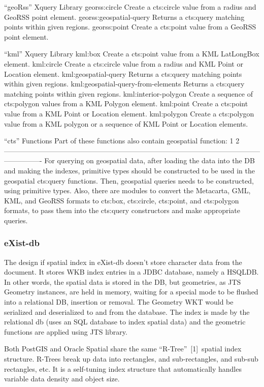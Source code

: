 \documentclass[a4paper,12pt]{article}
\begin{document}
“geoRss” Xquery Library
georss:circle
Create a cts:circle value from a radius and GeoRSS point element.
georss:geospatial-query
Returns a cts:query matching points within given regions.
georss:point
Create a cts:point value from a GeoRSS point element.

“kml” Xquery Library
kml:box
Create a cts:point value from a KML LatLongBox element.
kml:circle
Create a cts:circle value from a radius and KML Point or Location element.
kml:geospatial-query
Returns a cts:query matching points within given regions.
kml:geospatial-query-from-elements
Returns a cts:query matching points within given regions.
kml:interior-polygon
Create a sequence of cts:polygon values from a KML Polygon element.
kml:point
Create a cts:point value from a KML Point or Location element.
kml:polygon
Create a cts:polygon value from a KML polygon or a sequence of KML Point or Location elements.


“cts” Functions
Part of these functions also contain geospatial function: 1 2
----------------------------------------------------------------------------------------------------------------------------
For querying on geospatial data, after loading the data into the DB and making the indexes, primitive types should be constructed to be used in the geospatial cts:query functions. Then, geospatial queries needs to be constructed, using primitive types. 
Also, there are modules to convert the Metacarta, GML, KML, and GeoRSS formats to cts:box, cts:circle, cts:point, and cts:polygon formats, to pass them into the cts:query constructors and make appropriate queries.

\subsubsection{eXist-db}
The design if spatial index in eXist-db doesn't store character data from the document. It stores WKB index entries in a JDBC database, namely a HSQLDB. In other words, the spatial data is stored in the DB, but geometries, as JTS Geometry instances, are held in memory, waiting for a special mode to be flushed into a relational DB, insertion or removal. The Geometry WKT would be serialized and deserialized to and from the database.
The index is made by the relational db (uses an SQL database to index spatial data) and the geometric functions are applied using JTS library.



Both PostGIS and Oracle Spatial share the same “R-Tree” [1] spatial index structure. R-Trees break up data into rectangles, and sub-rectangles, and sub-sub rectangles, etc. It is a self-tuning index structure that automatically handles variable data density and object size.
\end{document}
